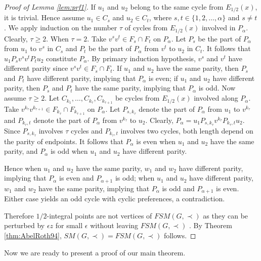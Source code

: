 \documentclass[11pt]{article}
\numberwithin{theorem}{section}
\begin{document}
\begin{proof}[Proof of Lemma \ref{lem:prf1}]
If $u_1$ and $u_2$ belong to the same cycle from $E_{1/2}(x)$, it is trivial. Hence assume $u_1\in C_s$ and $u_2\in C_t$, where $s,t\in \{1,2,\ldots,\alpha\}$ and $s\not=t$. We apply induction on the number $\tau$ of cycles from $E_{1/2}(x)$ involved in $P_\alpha$. Clearly, $\tau\geq 2$.
When $\tau=2$. Take $v^s v^t\in F_s\cap F_t$ on $P_\alpha$.
Let $P_s$ be the part of $P_\alpha$ from $u_1$ to $v^s$ in $C_s$ and $P_t$ be the part of $P_\alpha$ from $v^t$ to $u_2$ in $C_t$.
It follows that $u_1 P_s v^s v^t P_t u_2$ constitute $P_\alpha$.
By primary induction hypothesis, $v^s$ and $v^t$ have different parity since $v^s v^t\in F_s\cap F_t$.
If $u_1$ and $u_2$ have the same parity, then $P_s$ and $P_t$ have different parity, implying that $P_\alpha$ is even; if $u_1$ and $u_2$ have different parity, then $P_s$ and $P_t$ have the same parity, implying that $P_\alpha$ is odd.
Now assume $\tau\geq 2$. Let $C_{k_1},\ldots,C_{k_\tau},C_{k_{\tau+1}}$ be cycles from $E_{1/2}(x)$ involved along $P_\alpha$.
Take $v^{k_{\tau}} v^{k_{\tau+1}} \in F_{k_{\tau}}\cap F_{k_{\tau+1}}$ on $P_\alpha$.
Let $P_{s, k_{\tau}}$ denote the part of $P_\alpha$ from $u_1$ to $v^{k_{\tau}}$ and $P_{k_{\tau},t}$ denote the part of $P_\alpha$ from $v^{k_{\tau}}$ to $u_2$.
Clearly, $P_\alpha=u_1 P_{s,k_\tau} v^{k_\tau} P_{k_\tau, t} u_2$. Since $P_{s, k_{\tau}}$ involves $\tau$ cycles and $P_{k_{\tau},t}$ involves two cycles, both length depend on the parity of endpoints. It follows that $P_\alpha$ is even when $u_1$ and $u_2$ have the same parity, and $P_\alpha$ is odd when $u_1$ and $u_2$ have different parity.

Hence when $u_1$ and $u_2$ have the same parity, $w_1$ and $w_2$ have different parity, implying that $P_\alpha$ is even and $P_{\alpha+1}$ is odd;
when $u_1$ and $u_2$ have different parity, $w_1$ and $w_2$ have the same parity, implying that $P_\alpha$ is odd and $P_{\alpha+1}$ is even.
Either case yields an odd cycle with cyclic preferences, a contradiction.

Therefore $1/2$-integral points are not vertices of $FSM(G,\prec)$ as they can be perturbed by $\epsilon z$ for small $\epsilon$ without leaving $FSM(G,\prec)$ . By Theorem \ref{thm:AbelRoth94}, $SM(G,\prec)=FSM(G,\prec)$ follows.
\end{proof}

Now we are ready to present a proof of our main theorem.
\end{document}
